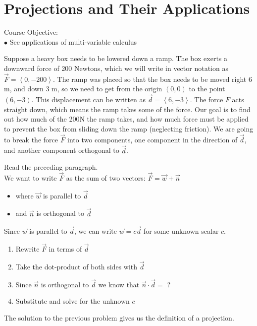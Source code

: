 \section{Projections and Their Applications}
\large Course Objective: \normalsize \\
\indent $\bullet$ See applications of multi-variable calculus

\vskip0.2in

Suppose a heavy box needs to be lowered down a ramp.  
The box exerts a downward force of 200 Newtons, which we will write in vector notation as $\vec F=\left<0,-200\right>$. 
The ramp was placed so that the box needs to be moved right 6 m, and down 3 m, so we need to get from the origin $(0,0)$ to the point $(6,-3)$.  This displacement can be written as $\vec d=\left<6,-3\right>$. The force $F$ acts straight down, which means the ramp takes some of the force. Our goal is to find out how much of the 200N the ramp takes, and how much force must be applied to prevent the box from sliding down the ramp (neglecting friction). We are going to break the force $\vec F$ into two components, one component in the direction of $\vec d$, and another component orthogonal to $\vec d$. 

\begin{problem}\label{prob:force intro}
Read the preceding paragraph.\\
We want to write $\vec F$ as the sum of two vectors: $\vec F = \vec w+\vec n$
\begin{itemize}
	\item where $\vec w$ is parallel to $\vec d$ 
	\item and $\vec n$ is orthogonal to $\vec d$
\end{itemize}
Since $\vec w$ is parallel to $\vec d$, we can write $\vec w=c\vec d$ for some unknown scalar $c$.\\
\begin{enumerate}
	\item Rewrite $\vec F$ in terms of $\vec d$
	\item Take the dot-product of both sides with $\vec d$
	\item Since $\vec n$ is orthogonal to $\vec d$ we know that $\vec n \cdot \vec d =$ ?
	\item Substitute and solve for the unknown $c$
\end{enumerate}
\end{problem}

The solution to the previous problem gives us the definition of a projection.

